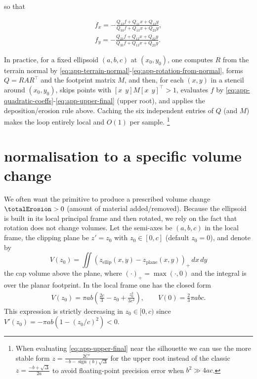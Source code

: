 so that

\begin{align}
    \label{eq:app-fx}
    f_x = -\frac{Q_{13}f + Q_{11}x + Q_{12}y}{Q_{33}f + Q_{13}x + Q_{23}y}, \\
    \label{eq:app-fy}
    f_y = -\frac{Q_{23}f + Q_{12}x + Q_{22}y}{Q_{33}f + Q_{13}x + Q_{23}y}.
\end{align}

In practice, for a fixed ellipsoid $(a,b,c)$ at $(x_0,y_0)$, one computes $R$ from the terrain normal by \cref{eq:app-terrain-normal}-\cref{eq:app-rotation-from-normal}, forms $Q=RAR^\top $ and the footprint matrix $M$, and then, for each $(x,y)$ in a stencil around $(x_0,y_0)$, skips points with $[x\ \ y] M [x\ \ y]^\top >1$, evaluates $f$ by \cref{eq:app-quadratic-coeffs}-\cref{eq:app-upper-final} (upper root), and applies the deposition/erosion rule above. Caching the six independent entries of $Q$ (and $M$) makes the loop entirely local and $O(1)$ per sample. 
\footnote{When evaluating \cref{eq:app-upper-final} near the silhouette we can use the more stable form
$z=\frac{2C'}{-b - \operatorname{sign}(b)\sqrt{\Delta}}$
for the upper root instead of the classic 
$z=\frac{-b + \sqrt{\Delta}}{2a}$ 
to avoid floating-point precision error when $b^2 \gg 4ac$.}



\section*{normalisation to a specific volume change}

We often want the primitive to produce a prescribed volume change $\totalErosion>0$ (amount of material added/removed). Because the ellipsoid is built in its local principal frame and then rotated, we rely on the fact that rotation does not change volumes. Let the semi-axes be $(a,b,c)$ in the local frame, the clipping plane be $z'=z_0$ with $z_0\in[0,c]$ (default $z_0=0$), and denote by
\[
V(z_0)=\iint \left(z_{\text{ellip}}(x,y)-z_{\text{plane}}(x,y)\right)_+\,dx\,dy
\]
the cap volume above the plane, where $(\cdot)_+=\max(\cdot,0)$ and the integral is over the planar footprint. In the local frame one has the closed form
\begin{align}
    \label{eq:app-cap-volume}
    V(z_0)=\pi a b\left(\frac{2c}{3}-z_0+\frac{z_0^3}{3c^2}\right),\qquad V(0)=\frac{2}{3}\pi a b c.
\end{align}
This expression is strictly decreasing in $z_0\in[0,c)$ since $V'(z_0)=-\pi a b\left(1-(z_0/c)^2\right)<0$.

